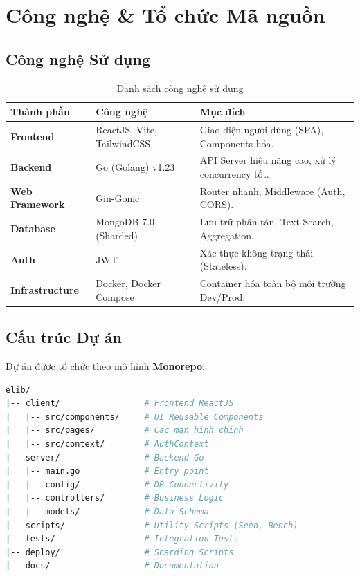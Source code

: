 \documentclass[a4paper,12pt]{article}
\begin{document}
\section{Công nghệ \& Tổ chức Mã nguồn}

\subsection{Công nghệ Sử dụng}
\begin{table}[H]
\centering
\begin{tabularx}{\textwidth}{|l|X|X|}
\hline
\textbf{Thành phần} & \textbf{Công nghệ} & \textbf{Mục đích} \\
\hline
\textbf{Frontend} & ReactJS, Vite, TailwindCSS & Giao diện người dùng (SPA), Components hóa. \\
\hline
\textbf{Backend} & Go (Golang) v1.23 & API Server hiệu năng cao, xử lý concurrency tốt. \\
\hline
\textbf{Web Framework} & Gin-Gonic & Router nhanh, Middleware (Auth, CORS). \\
\hline
\textbf{Database} & MongoDB 7.0 (Sharded) & Lưu trữ phân tán, Text Search, Aggregation. \\
\hline
\textbf{Auth} & JWT & Xác thực không trạng thái (Stateless). \\
\hline
\textbf{Infrastructure} & Docker, Docker Compose & Container hóa toàn bộ môi trường Dev/Prod. \\
\hline
\end{tabularx}
\caption{Danh sách công nghệ sử dụng}
\end{table}

\subsection{Cấu trúc Dự án}
Dự án được tổ chức theo mô hình \textbf{Monorepo}:

\begin{lstlisting}[language=bash, caption=Cây thư mục dự án]
elib/
|-- client/                 # Frontend ReactJS
|   |-- src/components/     # UI Reusable Components
|   |-- src/pages/          # Cac man hinh chinh
|   |-- src/context/        # AuthContext
|-- server/                 # Backend Go
|   |-- main.go             # Entry point
|   |-- config/             # DB Connectivity
|   |-- controllers/        # Business Logic
|   |-- models/             # Data Schema
|-- scripts/                # Utility Scripts (Seed, Bench)
|-- tests/                  # Integration Tests
|-- deploy/                 # Sharding Scripts
|-- docs/                   # Documentation
\end{lstlisting}
\end{document}
